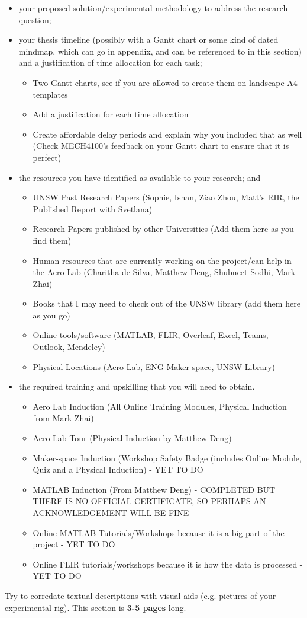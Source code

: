 \begin{itemize}
    \item your proposed solution/experimental methodology to address the research question;
    \item your thesis timeline (possibly with a Gantt chart or some kind of dated mindmap, which can go in appendix, and can be referenced to in this section) and a justification of time allocation for each task;
    \begin{itemize}
        \item Two Gantt charts, see if you are allowed to create them on landscape A4 templates
        \item Add a justification for each time allocation
        \item Create affordable delay periods and explain why you included that as well (Check MECH4100's feedback on your Gantt chart to ensure that it is perfect)
    \end{itemize}
    \item the resources you have identified as available to your research; and
    \begin{itemize}
        \item UNSW Past Research Papers (Sophie, Ishan, Ziao Zhou, Matt's RIR, the Published Report with Svetlana)
        \item Research Papers published by other Universities (Add them here as you find them)
        \item Human resources that are currently working on the project/can help in the Aero Lab (Charitha de Silva, Matthew Deng, Shubneet Sodhi, Mark Zhai)
        \item Books that I may need to check out of the UNSW library (add them here as you go)
        \item Online tools/software (MATLAB, FLIR, Overleaf, Excel, Teams, Outlook, Mendeley)
        \item Physical Locations (Aero Lab, ENG Maker-space, UNSW Library)
    \end{itemize}
    \item the required training and upskilling that you will need to obtain.
    \begin{itemize}
        \item Aero Lab Induction (All Online Training Modules, Physical Induction from Mark Zhai)
        \item Aero Lab Tour (Physical Induction by Matthew Deng)
        \item Maker-space Induction (Workshop Safety Badge (includes Online Module, Quiz and a Physical Induction) - YET TO DO
        \item MATLAB Induction (From Matthew Deng) - COMPLETED BUT THERE IS NO OFFICIAL CERTIFICATE, SO PERHAPS AN ACKNOWLEDGEMENT WILL BE FINE
        \item Online MATLAB Tutorials/Workshops because it is a big part of the project - YET TO DO
        \item Online FLIR tutorials/workshops because it is how the data is processed - YET TO DO
    \end{itemize}
\end{itemize}
Try to corredate textual descriptions with visual aids (e.g. pictures of your experimental rig).
This section is \textbf{3-5 pages} long. 